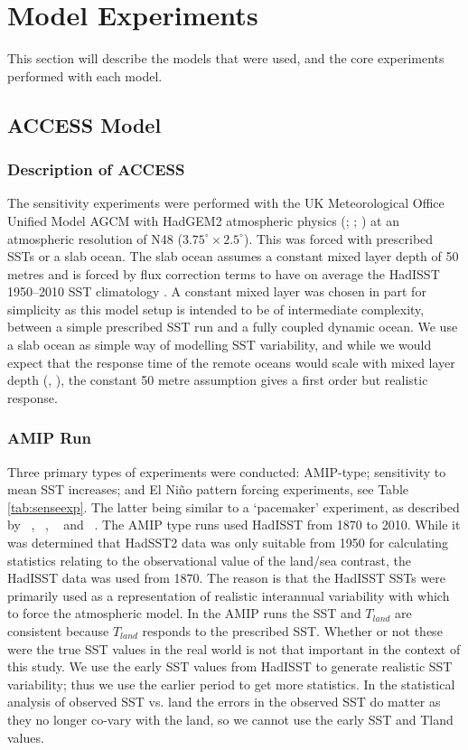 \section{Model Experiments}

This section will describe the models that were used, and the core experiments 
performed with each model.


\subsection{ACCESS Model}

\subsubsection{Description of ACCESS}
The sensitivity experiments were performed with the UK Meteorological Office 
Unified Model AGCM with HadGEM2 atmospheric physics (\citet{Davies2005}; 
\citet{Martin2010}; \citet{Bellouin2011}) at an atmospheric resolution of N48 
($3.75^{\circ} \times 
2.5^{\circ}$). This was forced with prescribed SSTs or a slab ocean. The slab
ocean assumes a constant mixed layer depth of 50 metres and is forced by flux 
correction terms to have on average the HadISST 1950--2010 SST climatology 
\citep{Wang2014}. A constant mixed layer was chosen in part for simplicity as 
this model setup is intended to be of intermediate complexity, between a simple 
prescribed SST run and a fully coupled dynamic ocean. We use a slab ocean as 
simple way of modelling SST variability, and while we would expect that the 
response time of the remote oceans would scale with mixed layer depth 
(\citealt{Su2005a}, \citealt{Lintner2007}), the constant 
50 metre assumption gives a first order but realistic response.

\subsubsection{AMIP Run}
Three primary types of experiments were conducted: AMIP-type; sensitivity to 
mean SST increases; and El Ni{\~n}o pattern forcing experiments, see Table 
\ref{tab:senseexp}. The latter being similar to a `pacemaker' experiment, as 
described by ~\citealt{Alexander1992}, ~\citealt{Alexander1992a}, 
~\citealt{Lau2000} and ~\citealt{Lu2011}. The AMIP type runs used HadISST from 
1870 to 2010. While it was determined that HadSST2 data was only suitable
from 1950 for calculating statistics relating to the observational value of the 
land/sea contrast, the HadISST data was used from 1870. The reason is that the 
HadISST SSTs were primarily used as a representation of realistic interannual 
variability with which to force the atmospheric model.  In the AMIP runs the SST 
and $T_{land}$ are consistent because $T_{land}$ responds to the prescribed SST.  
Whether or not these were the true SST values in the real world is not that 
important in the context of this study.  We use the early SST values from 
HadISST to generate realistic SST variability; thus we use the earlier period to 
get more statistics. In the statistical analysis of observed SST vs. land the 
errors in the observed SST do matter as they no longer co-vary with the land, so 
we cannot use the early SST and Tland values. 

